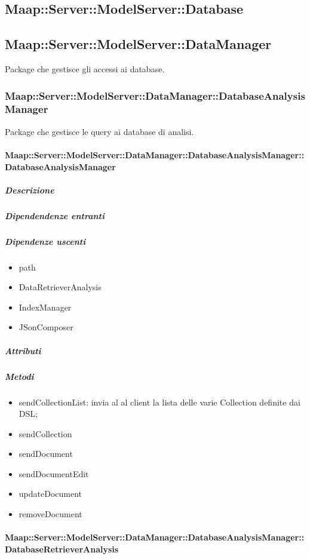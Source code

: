 \subsection{Maap::Server::ModelServer::Database}

\subsection{Maap::Server::ModelServer::DataManager}
Package che gestisce gli accessi ai database.

\subsubsection{Maap::Server::ModelServer::DataManager::DatabaseAnalysisManager}
Package che gestisce le query ai database di analisi. 

\paragraph{Maap::Server::ModelServer::DataManager::DatabaseAnalysisManager::DatabaseAnalysisManager}

\subparagraph{Descrizione}

\subparagraph{Dipendendenze entranti}

\subparagraph{Dipendenze uscenti}
\begin{itemize}
\item{path}
\item{DataRetrieverAnalysis}
\item{IndexManager}
\item{JSonComposer}
\end{itemize}

\subparagraph{Attributi}

\subparagraph{Metodi}
\begin{itemize}
\item{sendCollectionList:} invia al al client la lista delle varie Collection 
definite dai DSL; 
\item{sendCollection}
\item{sendDocument}
\item{sendDocumentEdit}
\item{updateDocument}
\item{removeDocument}
\end{itemize}

\paragraph{Maap::Server::ModelServer::DataManager::DatabaseAnalysisManager::DatabaseRetrieverAnalysis}

